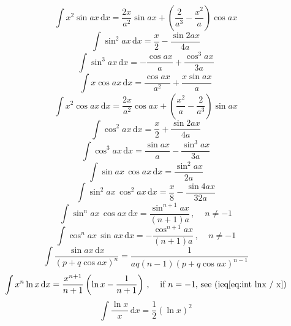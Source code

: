 \documentclass[fleqn,leqno]{article}
\providecommand*{\diff}{\ensuremath{\mathrm{d}}}
\begin{document}
%
%
\begin{equation}
	\int x^2\sin ax\, \diff x = \frac{2x}{a^2} \sin ax + 
	\left( \frac{2}{a^3} - \frac{x^2}{a} \right)\cos ax
\end{equation}
%
%
\begin{equation}
	\int \sin^2 ax\, \diff x = \frac{x}{2} - \frac{\sin 2ax}{4a}
\end{equation}
%
%
\begin{equation}
	\int \sin^3 ax\, \diff x = -\frac{\cos ax}{a} + \frac{\cos^3 ax}{3a}
\end{equation}
%
%
\begin{equation}
	\int x\cos ax\, \diff x = \frac{\cos ax}{a^2} + \frac{x\sin ax}{a}
\end{equation}
%
%
\begin{equation}
	\int x^2\cos ax\, \diff x = \frac{2x}{a^2} \cos ax + 
	\left( \frac{x^2}{a} - \frac{2}{a^3} \right)\sin ax
\end{equation}
%
%
\begin{equation}
	\int \cos^2 ax\, \diff x = \frac{x}{2} + \frac{\sin 2ax}{4a}
\end{equation}
%
%
\begin{equation}
	\int \cos^3 ax\, \diff x = \frac{\sin ax}{a} - \frac{\sin^3 ax}{3a}
\end{equation}
%
%
\begin{equation}
	\int \sin ax\, \cos ax \, \diff x = \frac{\sin^2 ax}{2a}
\end{equation}
%
%
\begin{equation}
	\int \sin^2 ax\, \cos^2 ax \, \diff x = \frac{x}{8} - \frac{\sin 4ax}{32a}
\end{equation}
%
%
\begin{equation}
	\int \sin^n ax\, \cos ax\, \diff x = \frac{\sin^{n+1} ax}{(n+1)a}\,, \mspace{20mu} n\ne-1
\end{equation}
%
%
\begin{equation}
	\int \cos^n ax\, \sin ax\, \diff x = -\frac{\cos^{n+1} ax}{(n+1)a}\,, \mspace{20mu} n\ne-1
\end{equation}
%
%
\begin{equation}
	\int\frac{\sin{ax}\, \diff x}{(p + q \cos{ax})^n} = \frac{1}{aq(n-1)(p + q \cos{ax})^{n-1}}
\end{equation}
%
%
%
%
\begin{equation}
	\int x^n \ln x\, \diff x = \frac{x^{n+1}}{n+1} \left( \ln x - \frac{1}{n+1} \right)\,,
	\mspace{20mu} \text{if $n=-1$, see (ieq\ref{eq:int lnx / x})}
\end{equation}
%
%
\begin{equation}\label{eq:int lnx / x}
	\int \frac{\ln x}{x}\, \diff x = \frac{1}{2} \left( \ln x \right)^2
\end{equation}
\end{document}
